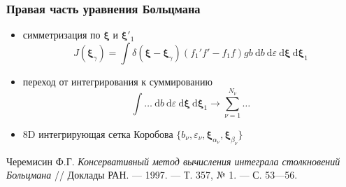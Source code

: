 \documentclass[ucs]{beamer}
\newcommand{\dd}{\:\mathrm{d}}
\begin{document}
\begin{frame}
	\frametitle{Правая часть уравнения Больцмана}
	\begin{itemize}
		\item симметризация по \(\boldsymbol\xi\) и \(\boldsymbol\xi'_1\)
			\[
				J(\boldsymbol\xi_\gamma) = \int\delta(\boldsymbol\xi-\boldsymbol\xi_\gamma)
				(f_1' f' - f_1 f) gb \dd{b} \dd\varepsilon \dd\boldsymbol\xi \dd\boldsymbol\xi_1
			\]
		\item переход от интегрирования к суммированию
			\[ \int\dots\dd{b}\dd\varepsilon\dd\boldsymbol\xi\dd\boldsymbol\xi_1 \to \sum\limits_{\nu=1}^{N_\nu}\dots \]
		\item 8D интегрирующая сетка Коробова \( \{b_\nu,\varepsilon_\nu,\boldsymbol\xi_{\alpha_\nu},\boldsymbol\xi_{\beta_\nu}\} \)
	\end{itemize}
	\begin{block}{}\scriptsize
		Черемисин Ф.Г. \textit{Консервативный метод вычисления интеграла столкновений Больцмана}
			// Доклады РАН. — 1997. — Т. 357, № 1. — С. 53—56.
	\end{block}
\end{frame}
\end{document}
